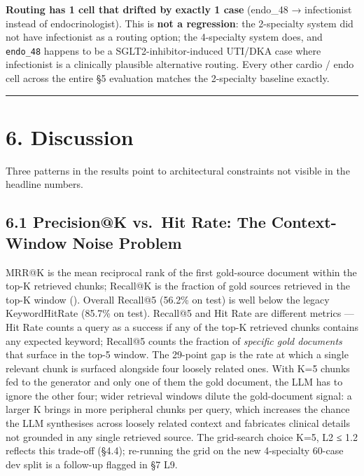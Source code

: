 \documentclass[
  american,
  a4paper,
]{article}
\begin{document}
\textbf{Routing has 1 cell that drifted by exactly 1 case} (endo\_48 →
infectionist instead of endocrinologist). This is \textbf{not a
regression}: the 2-specialty system did not have infectionist as a
routing option; the 4-specialty system does, and \texttt{endo\_48}
happens to be a SGLT2-inhibitor-induced UTI/DKA case where infectionist
is a clinically plausible alternative routing. Every other cardio / endo
cell across the entire §5 evaluation matches the 2-specialty baseline
exactly.

\begin{center}\rule{0.5\linewidth}{0.5pt}\end{center}

\section{6. Discussion}\label{discussion}

Three patterns in the results point to architectural constraints not
visible in the headline numbers.

\subsection{6.1 Precision@K vs.~Hit Rate: The Context-Window Noise
Problem}\label{precisionk-vs.-hit-rate-the-context-window-noise-problem}

MRR@K is the mean reciprocal rank of the first gold-source document
within the top-K retrieved chunks; Recall@K is the fraction of gold
sources retrieved in the top-K window
(). Overall Recall@5
(56.2\% on test) is well below the legacy KeywordHitRate (85.7\% on
test). Recall@5 and Hit Rate are different metrics --- Hit Rate counts a
query as a success if any of the top-K retrieved chunks contains any
expected keyword; Recall@5 counts the fraction of \emph{specific gold
documents} that surface in the top-5 window. The 29-point gap is the
rate at which a single relevant chunk is surfaced alongside four loosely
related ones. With K=5 chunks fed to the generator and only one of them
the gold document, the LLM has to ignore the other four; wider retrieval
windows dilute the gold-document signal: a larger K brings in more
peripheral chunks per query, which increases the chance the LLM
synthesises across loosely related context and fabricates clinical
details not grounded in any single retrieved source. The grid-search
choice K=5, L2 ≤ 1.2 reflects this trade-off (§4.4); re-running the grid
on the new 4-specialty 60-case dev split is a follow-up flagged in §7
L9.
\end{document}
